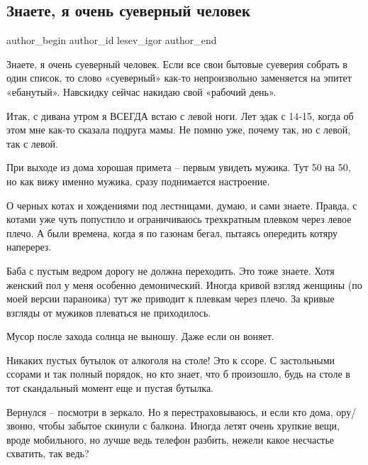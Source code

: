 
 
 
 
 
 
\subsection{Знаете, я очень суеверный человек}
\label{sec:14_02_2022.tg.lesev_igor.1.suevernyj_chelovek}
 
\ifcmt
 author_begin
   author_id lesev_igor
 author_end
\fi

Знаете, я очень суеверный человек. Если все свои бытовые суеверия собрать в
один список, то слово «суеверный» как-то непроизвольно заменяется на эпитет
«ебанутый». Навскидку сейчас накидаю свой «рабочий день».

Итак, с дивана утром я ВСЕГДА встаю с левой ноги. Лет эдак с 14-15, когда об
этом мне как-то сказала подруга мамы. Не помню уже, почему так, но с левой, так
с левой.

При выходе из дома хорошая примета – первым увидеть мужика. Тут 50 на 50, но
как вижу именно мужика, сразу поднимается настроение.

О черных котах и хождениями под лестницами, думаю, и сами знаете. Правда, с
котами уже чуть попустило и ограничиваюсь трехкратным плевком через левое
плечо. А были времена, когда я по газонам бегал, пытаясь опередить котяру
наперерез.

Баба с пустым ведром дорогу не должна переходить. Это тоже знаете. Хотя женский
пол у меня особенно демонический. Иногда кривой взгляд женщины (по моей версии
параноика) тут же приводит к плевкам через плечо. За кривые взгляды от мужиков
плеваться не приходилось.

Мусор после захода солнца не выношу. Даже если он воняет.

Никаких пустых бутылок от алкоголя на столе! Это к ссоре. С застольными ссорами
и так полный порядок, но кто знает, что б произошло, будь на столе в тот
скандальный момент еще и пустая бутылка.

Вернулся – посмотри в зеркало. Но я перестраховываюсь, и если кто дома,
ору/звоню, чтобы забытое скинули с балкона. Иногда летят очень хрупкие вещи,
вроде мобильного, но лучше ведь телефон разбить, нежели какое несчастье
схватить, так ведь?

